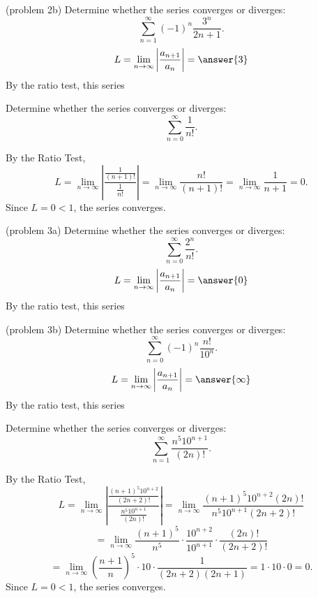 \documentclass{ximera}
\begin{document}
\begin{problem}(problem 2b)
Determine whether the series converges or diverges:
\[
\sum_{n=1}^\infty (-1)^n\frac{3^n}{2n+1}.
\]
\[
L = \lim_{n \to \infty} \left|\frac{a_{n+1}}{a_n}\right| = \answer{3}
\]
By the ratio test, this series 

\end{problem}



\begin{example}[example 3]
Determine whether the series converges or diverges:
\[
\sum_{n=0}^\infty \frac{1}{n!}.
\]

By the Ratio Test,
\[
L =  \lim_{n \to \infty} \left|\frac{\frac{1}{(n+1)!}}{\frac{1}{n!}}\right| =  \lim_{n \to \infty} \frac{n!}{(n+1)!} =  \lim_{n \to \infty} \frac{1}{n+1} = 0.
\]
Since $L = 0 < 1$, the series converges.
\end{example}



\begin{problem}(problem 3a)
Determine whether the series converges or diverges:
\[
\sum_{n=0}^\infty \frac{2^n}{n!}.
\]
\[
L = \lim_{n \to \infty} \left|\frac{a_{n+1}}{a_n}\right| = \answer{0}
\]
By the ratio test, this series 

\end{problem}



\begin{problem}(problem 3b)
Determine whether the series converges or diverges:
\[
\sum_{n=0}^\infty (-1)^n\frac{n!}{10^n}.
\]
\[
L = \lim_{n \to \infty} \left|\frac{a_{n+1}}{a_n}\right| = \answer{\infty}
\]
By the ratio test, this series 

\end{problem}

\begin{example}[example 4]
Determine whether the series converges or diverges:
\[
\sum_{n=1}^\infty \frac{n^5 10^{n+1}}{(2n)!}.
\]

By the Ratio Test,
\[
L =  \lim_{n \to \infty} \left|\frac{\frac{(n+1)^5 10^{n+2}}{(2n+2)!}}{\frac{n^5 10^{n+1}}{(2n)!}}\right| 
=  \lim_{n \to \infty} \frac{(n+1)^5 10^{n+2}(2n)!}{n^5 10^{n+1}(2n+2)!}
\]
\[
 =  \lim_{n \to \infty} \frac{(n+1)^5}{n^5} \cdot \frac{10^{n+2}}{10^{n+1}} \cdot \frac{(2n)!}{(2n+2)!} 
 \]
 \[
 = 
  \lim_{n \to \infty} \left(\frac{n+1}{n}\right)^5 \cdot 10 \cdot \frac{1}{(2n+2)(2n+1)} = 1 \cdot 10 \cdot 0 = 0.
\]
Since $L = 0 < 1$, the series converges.
\end{example}
\end{document}

